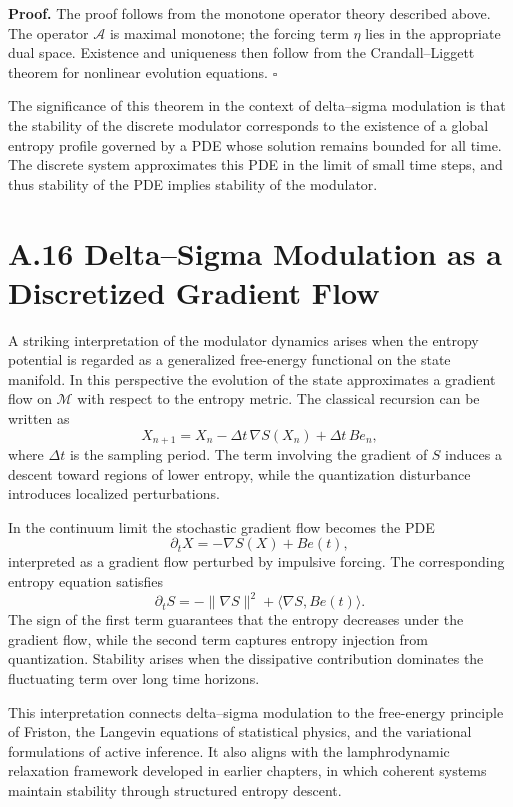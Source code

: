 \textbf{Proof.}
The proof follows from the monotone operator theory described above. The operator \(\mathcal{A}\) is maximal monotone; the forcing term \(\eta\) lies in the appropriate dual space. Existence and uniqueness then follow from the Crandall–Liggett theorem for nonlinear evolution equations. \(\square\)

\medskip

The significance of this theorem in the context of delta–sigma modulation is that the stability of the discrete modulator corresponds to the existence of a global entropy profile governed by a PDE whose solution remains bounded for all time. The discrete system approximates this PDE in the limit of small time steps, and thus stability of the PDE implies stability of the modulator.

\section{A.16 Delta–Sigma Modulation as a Discretized Gradient Flow}

A striking interpretation of the modulator dynamics arises when the entropy potential is regarded as a generalized free-energy functional on the state manifold. In this perspective the evolution of the state approximates a gradient flow on \(\mathcal{M}\) with respect to the entropy metric. The classical recursion can be written as
\[
X_{n+1} = X_n - \Delta t \, \nabla S(X_n) + \Delta t\, B e_n,
\]
where \(\Delta t\) is the sampling period. The term involving the gradient of \(S\) induces a descent toward regions of lower entropy, while the quantization disturbance introduces localized perturbations.

In the continuum limit the stochastic gradient flow becomes the PDE
\[
\partial_t X = - \nabla S(X) + B e(t),
\]
interpreted as a gradient flow perturbed by impulsive forcing. The corresponding entropy equation satisfies
\[
\partial_t S = -\|\nabla S\|^2 + \langle \nabla S, B e(t)\rangle.
\]
The sign of the first term guarantees that the entropy decreases under the gradient flow, while the second term captures entropy injection from quantization. Stability arises when the dissipative contribution dominates the fluctuating term over long time horizons.

This interpretation connects delta–sigma modulation to the free-energy principle of Friston, the Langevin equations of statistical physics, and the variational formulations of active inference. It also aligns with the lamphrodynamic relaxation framework developed in earlier chapters, in which coherent systems maintain stability through structured entropy descent.

